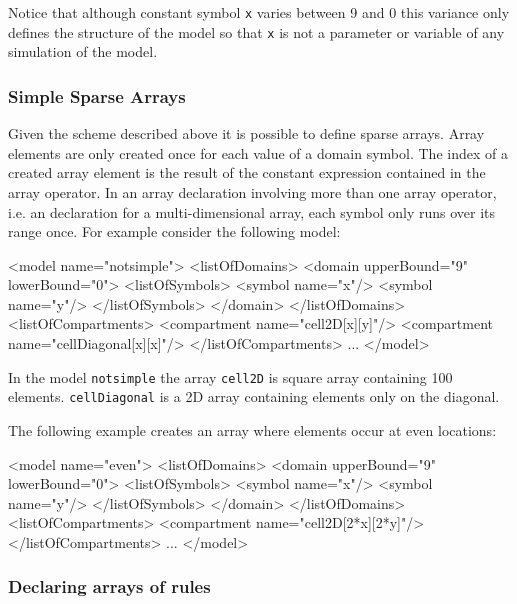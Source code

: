 \documentclass{cekarticle}
\begin{document}
Notice that although constant symbol \texttt{x} varies between 9
and 0 this variance only defines the structure of the model so
that \texttt{x} is not a parameter or variable of any simulation
of the model.

\subsubsection{Simple Sparse Arrays}

Given the scheme described above it is possible to define sparse
arrays. Array elements are only created once for each value of a
domain symbol. The index of a created array element is the result
of the constant expression contained in the array operator. In an
array declaration involving more than one array operator, i.e. an
declaration for a multi-dimensional array, each symbol only runs
over its range once. For example consider the following model:

\begin{example}
<model name="notsimple">
    <listOfDomains>
        <domain upperBound="9" lowerBound="0">
            <listOfSymbols>
                <symbol name="x"/>
                <symbol name="y"/>
            </listOfSymbols>
        </domain>
    </listOfDomains>
    <listOfCompartments>
        <compartment name="cell2D[x][y]"/>
        <compartment name="cellDiagonal[x][x]"/>
    </listOfCompartments>
    ...
</model>
\end{example}

In the model \texttt{notsimple} the array \texttt{cell2D} is square array
containing 100 elements.  \texttt{cellDiagonal} is a 2D array containing
elements only on the diagonal.

The following example creates an array where elements occur at even locations:

\begin{example}
<model name="even">
    <listOfDomains>
        <domain upperBound="9" lowerBound="0">
            <listOfSymbols>
                <symbol name="x"/>
                <symbol name="y"/>
            </listOfSymbols>
        </domain>
    </listOfDomains>
    <listOfCompartments>
        <compartment name="cell2D[2*x][2*y]"/>
    </listOfCompartments>
    ...
</model>
\end{example}

\subsubsection{Declaring arrays of rules}
\end{document}
